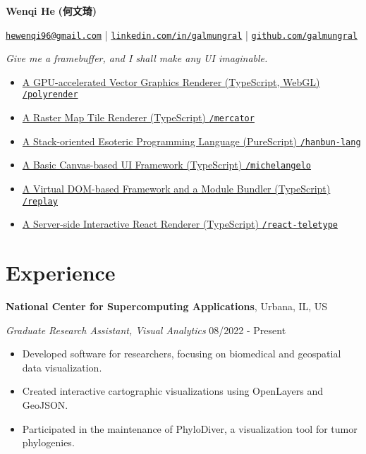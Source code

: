 \documentclass[12pt]{article}
\begin{document}
{\Huge\bf Wenqi He} {\Large\bf\cjkfont (何文琦)}

\vspace{1em}
\href{mailto:hewenqi96@gmail.com}{\texttt{hewenqi96@gmail.com}} | \href{https://linkedin.com/in/galmungral}{\texttt{linkedin.com/in/galmungral}} | \href{https://github.com/galmungral}{\texttt{github.com/galmungral}}

\vspace{1em}
\textit{Give me a framebuffer, and I shall make any UI imaginable.}

\begin{itemize}
\item \href{https://galmungral.github.io/polyrender}{A GPU-accelerated Vector Graphics Renderer (TypeScript, WebGL) \hfill \texttt{/polyrender}}
\item \href{https://galmungral.github.io/mercator?lon=-73.9855&lat=40.7580}{A Raster Map Tile Renderer (TypeScript) \hfill \texttt{/mercator}}
\item \href{https://galmungral.github.io/hanbun-lang}{A Stack-oriented Esoteric Programming Language (PureScript) \hfill \texttt{/hanbun-lang}}
\item \href{https://galmungral.github.io/michelangelo}{A Basic Canvas-based UI Framework (TypeScript) \hfill \texttt{/michelangelo}}
\item \href{https://github.com/galmungral/replay}{A Virtual DOM-based Framework and a Module Bundler (TypeScript) \hfill \texttt{/replay}}
\item\href{https://github.com/galmungral/react-teletype}{A Server-side Interactive React Renderer (TypeScript) \hfill \texttt{/react-teletype}}
\end{itemize}

\section*{Experience}

\textbf{National Center for Supercomputing Applications}, Urbana, IL, US

\textit{Graduate Research Assistant, Visual Analytics} \hfill 08/2022 - Present

\begin{itemize}
\item Developed software for researchers, focusing on biomedical and geospatial data visualization.
\item Created interactive cartographic visualizations using OpenLayers and GeoJSON.
\item Participated in the maintenance of PhyloDiver, a visualization tool for tumor phylogenies.
\end{itemize}
\end{document}
